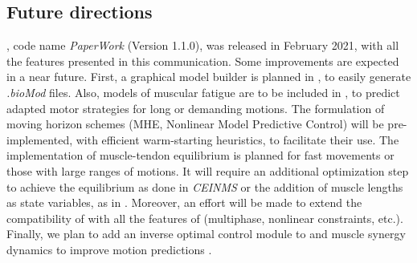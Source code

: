 \subsection{Future directions}

\bioptim, code name \textit{PaperWork} (Version 1.1.0), was released in February 2021, with all the features presented in this communication.
Some improvements are expected in a near future.
First, a graphical model builder is planned in \biorbd, to easily generate \textit{.bioMod} files.
Also, models of muscular fatigue are to be included in \bioptim, to predict adapted motor strategies for long or demanding motions.
The formulation of moving horizon schemes (MHE, Nonlinear Model Predictive Control) will be pre-implemented, with efficient warm-starting heuristics, to facilitate their use.
The implementation of muscle-tendon equilibrium is planned for fast movements or those with large ranges of motions. 
It will require an additional optimization step to achieve the equilibrium as done in \textit{CEINMS} \cite{pizzolato2015ceinms} or the addition of muscle lengths as state variables, as in \cite{van2011implicit}.  
Moreover, an effort will be made to extend the compatibility of \acados with all the features of \bioptim (multiphase, nonlinear constraints, etc.). 
Finally, we plan to add an inverse optimal control module to \bioptim and muscle synergy dynamics to improve motion predictions \cite{walter2014muscle}.
